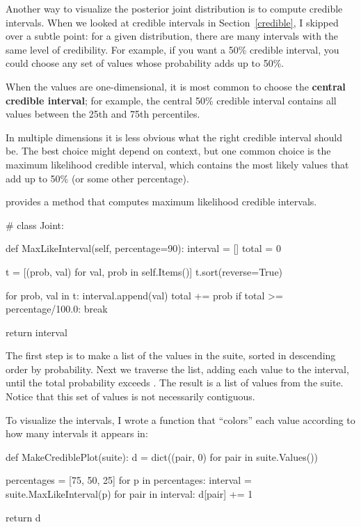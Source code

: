 \documentclass[12pt]{book}
\theoremstyle{exercise}
\begin{document}
Another way to visualize the posterior joint distribution is to
compute credible intervals.  When we looked at credible intervals
in Section~\ref{credible},
I skipped over a subtle point: for a given distribution, there
are many intervals with the same level of credibility.  For example,
if you want a 50\% credible interval, you could choose any set of
values whose probability adds up to 50\%.

When the values are one-dimensional, it is most common to choose
the {\bf central credible interval}; for example, the central 50\%
credible interval contains all values between the 25th and 75th
percentiles.

In multiple dimensions it is less obvious what the right credible
interval should be.  The best choice might depend on context, but
one common choice is the maximum likelihood credible interval, which
contains the most likely values that add up to 50\% (or some other
percentage).

 provides a method that computes maximum
likelihood credible intervals. 

\begin{code}
# class Joint:

    def MaxLikeInterval(self, percentage=90):
        interval = []
        total = 0

        t = [(prob, val) for val, prob in self.Items()]
        t.sort(reverse=True)

        for prob, val in t:
            interval.append(val)
            total += prob
            if total >= percentage/100.0:
                break

        return interval
\end{code}

The first step is to make a list of the values in the suite,
sorted in descending order by probability.  Next we traverse the
list, adding each value to the interval, until the total
probability exceeds .  The result is a list
of values from the suite.  Notice that this set of values
is not necessarily contiguous.

To visualize the intervals, I wrote a function that ``colors''
each value according to how many intervals it appears in:

\begin{code}
def MakeCrediblePlot(suite):
    d = dict((pair, 0) for pair in suite.Values())

    percentages = [75, 50, 25]
    for p in percentages:
        interval = suite.MaxLikeInterval(p)
        for pair in interval:
            d[pair] += 1

    return d
\end{code}
\end{document}
